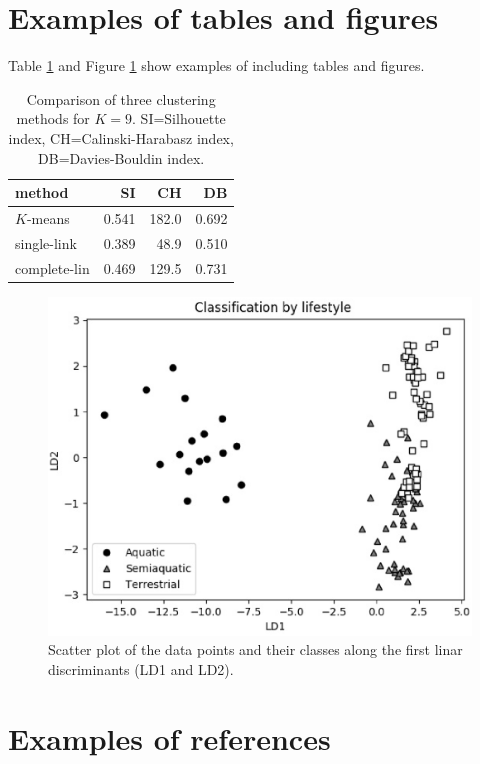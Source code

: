 \documentclass[a4paper,12pt]{article}
\begin{document}
\section{Examples of tables and figures}

Table \ref{tab1a} and Figure \ref{figLDplot} show examples of including tables and figures.

\begin{table}[!h]
\begin{center}
\caption{Comparison of three clustering methods for $K=9$. SI=Silhouette index, CH=Calinski-Harabasz index, DB=Davies-Bouldin index.}
\label{tab1a}
\begin{tabular}{|l|r|r|r|}
\hline
method&SI&CH&DB\\
\hline
$K$-means&0.541&182.0&0.692\\
single-link&0.389&48.9&0.510 \\
complete-lin&0.469&129.5&0.731\\
\hline
\end{tabular}
\end{center}
\end{table}


\begin{figure}[!h]
\includegraphics[width=\textwidth]{exLDplot.eps}
\caption{Scatter plot of the data points and their classes along the first linar discriminants (LD1 and LD2).}
\label{figLDplot}
\end{figure}


\section{Examples of references}
\end{document}
